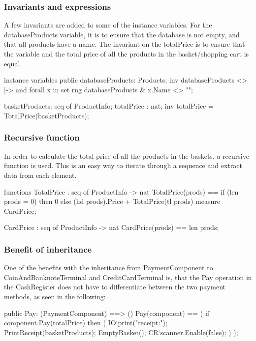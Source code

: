 \subsubsection{Invariants and expressions}
\vspace{-0.5cm}
A few invariants are added to some of the instance variables. For the databaseProducts variable, it is to ensure that the database is not empty, and that all products have a name.
The invariant on the totalPrice is to ensure that the variable and the total price of all the products in the basket/shopping cart is equal.
\begin{vdmpp}
instance variables
 public databaseProducts: Products;
  inv databaseProducts <> {|->} and 
   forall x in set rng databaseProducts &
    x.Name <> "";
   
 basketProducts: seq of ProductInfo;
 totalPrice : nat;
  inv totalPrice = TotalPrice(basketProducts); 
\end{vdmpp}


\subsubsection{Recursive function}
\vspace{-0.5cm}
In order to calculate the total price of all the products in the baskets, a recursive function is used. This is an easy way to iterate through a sequence and extract data from each element.
\begin{vdmpp}
functions
 TotalPrice : seq of ProductInfo -> nat
 TotalPrice(prods) == 
  if (len prods = 0) then
   0
  else
   (hd prods).Price + TotalPrice(tl prods)
  measure CardPrice;
  
 CardPrice : seq of ProductInfo -> nat
 CardPrice(prods) ==
  len prods; 
  
\end{vdmpp}


\subsubsection{Benefit of inheritance}
\vspace{-0.5cm}
One of the benefits with the inheritance from PaymentComponent to CoinAndBanknoteTerminal and CreditCardTerminal is, that the Pay operation in the CashRegister does not have to differentiate between the two payment methods, as seen in the following:
\begin{vdmpp}
 public Pay: (PaymentComponent) ==> ()
 Pay(component) ==
  (
   if component.Pay(totalPrice) then
   (
    IO`print("\nPayment receipt:\n");
    PrintReceipt(basketProducts);
    EmptyBasket();
    CR`scanner.Enable(false);
   )
  );
\end{vdmpp}


